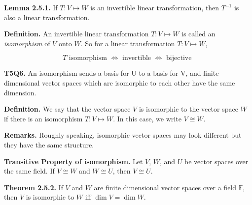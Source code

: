 \documentclass[10pt,landscape]{article}
\begin{document}
\begin{multicols}{4}







\textbf{Lemma 2.5.1.} If $T: V \mapsto W$ is an invertible linear transformation, then $T^{-1}$ is also a linear transformation.

\textbf{Definition.} An invertible linear transformation $T : V \mapsto W$ is called an \textit{isomorphism} of $V$ onto $W$. So for a linear transformation $T : V \mapsto W$,

$$
T \text{ isomorphism } \iff \text{ invertible } \iff \text{ bijective }
$$

\textbf{T5Q6.} An isomorphism sends a basis for U to a basis for V, and finite dimensional vector spaces which are isomorphic to each other have the same dimension.

\textbf{Definition.} We say that the vector space $V$ is isomorphic to the vector space $W$ if there is an isomorphism $T : V \mapsto W$. In this case, we write $V \cong W$.

\textbf{Remarks.} Roughly speaking, isomorphic vector spaces may look different but they have the same structure.

\textbf{Transitive Property of isomorphism.} Let $V$, $W$, and $U$ be vector spaces over the same field. If $V \cong W$ and $W \cong U$, then $V \cong U$.




\textbf{Theorem 2.5.2.} If $V$ and $W$ are finite dimensional vector spaces over a field $\mathbb{F}$, then $V$ is isomorphic to $W$ iff $\dim V = \dim W$. 


\end{multicols}
\end{document}
